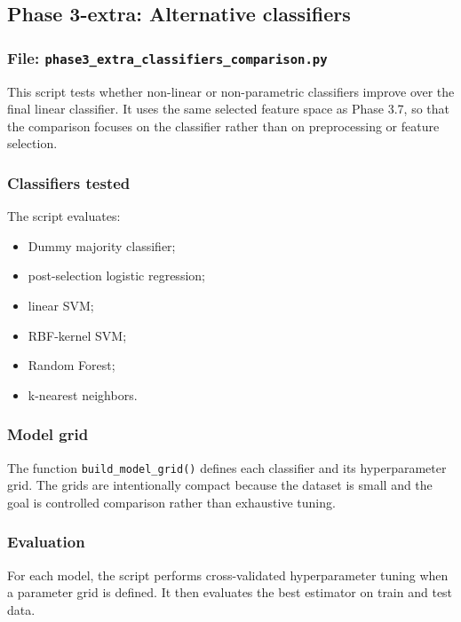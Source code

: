 \documentclass{ipgpmaster}
\begin{document}
\subsection{Phase 3-extra: Alternative classifiers}

\subsubsection{File: \texttt{phase3\_extra\_classifiers\_comparison.py}}

This script tests whether non-linear or non-parametric classifiers improve over the final linear classifier. It uses the same selected feature space as Phase 3.7, so that the comparison focuses on the classifier rather than on preprocessing or feature selection.

\subsubsection{Classifiers tested}

The script evaluates:

\begin{itemize}
    \item Dummy majority classifier;
    \item post-selection logistic regression;
    \item linear SVM;
    \item RBF-kernel SVM;
    \item Random Forest;
    \item k-nearest neighbors.
\end{itemize}

\subsubsection{Model grid}

The function \texttt{build\_model\_grid()} defines each classifier and its hyperparameter grid. The grids are intentionally compact because the dataset is small and the goal is controlled comparison rather than exhaustive tuning.

\subsubsection{Evaluation}

For each model, the script performs cross-validated hyperparameter tuning when a parameter grid is defined. It then evaluates the best estimator on train and test data.
\end{document}
